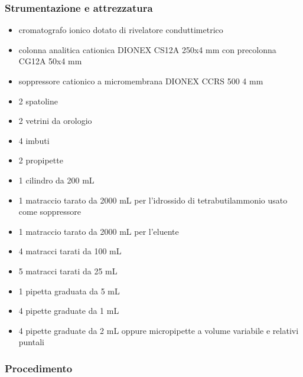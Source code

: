 \subsubsection{Strumentazione e attrezzatura}
\begin{itemize}
\item cromatografo ionico dotato di rivelatore conduttimetrico
\item colonna analitica cationica DIONEX CS12A 250x4 mm con precolonna CG12A 50x4 mm
\item soppressore cationico a micromembrana DIONEX CCRS 500 4 mm
\item 2 spatoline
\item 2 vetrini da orologio
\item 4 imbuti
\item 2 propipette
\item 1 cilindro da 200 mL
\item 1 matraccio tarato da 2000 mL per l'idrossido di tetrabutilammonio usato come soppressore
\item 1 matraccio tarato da 2000 mL per l'eluente
\item 4 matracci tarati da 100 mL
\item 5 matracci tarati da 25 mL
\item 1 pipetta graduata da 5 mL
\item 4 pipette graduate da 1 mL
\item 4 pipette graduate da 2 mL oppure micropipette a volume variabile e relativi puntali
\end{itemize}



\subsubsection{Procedimento}

